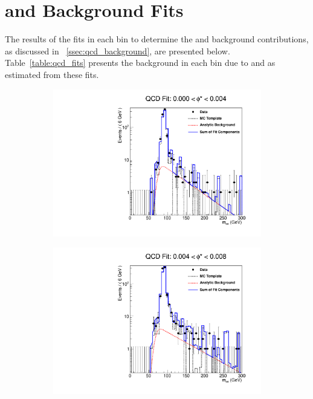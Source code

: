 \chapter{\texorpdfstring{\QCDjets and \wjets}{QCD multi-jet and W+Jets} Background Fits}
\label{app:qcd_fits}

The results of the fits in each \phistar bin to determine the \QCDjets and
\wjets background contributions, as discussed in
\SEC~\ref{ssec:qcd_background}, are presented below. Table~\ref{table:qcd_fits}
presents the background in each \phistar bin due to \QCDjets and
\wjets as estimated from these fits.

\begin{figure}[!htbp]
    \centering
    \begin{subfigure}[b]{\SideBySidePlotWidth}
        \includegraphics[width=\linewidth]{figures/qcd_fits/qcd_fit_plot_for_01.pdf}
        \label{fig:qcd_fit_01}
    \end{subfigure}%
    \begin{subfigure}[b]{\SideBySidePlotWidth}
        \includegraphics[width=\linewidth]{figures/qcd_fits/qcd_fit_plot_for_02.pdf}

\end{subfigure}
\end{figure}
